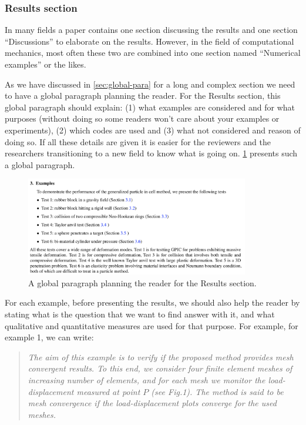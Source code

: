 \documentclass[authoryear,12pta4paper,fleqn]{article}
\numberwithin{equation}{section}
\theoremstyle{remark}
\begin{document}
\subsubsection{Results section}\label{sec:result}

In many fields a paper contains one section discussing the results and one section ``Discussions'' to elaborate on the results. However, in the field of computational mechanics, most often these two are combined into one section named ``Numerical examples'' or the likes.

As we have discussed in \cref{sec:global-para} for a long and complex section we need to have a global paragraph planning the reader. For the Results section, this global paragraph should explain: (1) what examples are considered and for what purposes (without doing so some readers won't care about your examples or experiments), (2) which codes are used and (3) what not considered and reason of doing so. If all these details are given it is easier for the reviewers and the researchers transitioning to a new field to know what is going on. \cref{fig:examples} presents such a global paragraph.

\begin{figure}[h!]
\centering
\includegraphics[width=0.87\textwidth]{examples}
\caption{A global paragraph planning the reader for the Results section.}
\label{fig:examples}
\end{figure}

For each example, before presenting the results, we should also help the reader by stating what is the question that we want to find answer with it, and what qualitative and quantitative measures are used for that purpose. For example, for example 1, we can write:

\begin{quote}
  \textit{
  The aim of this example is to verify if the proposed method provides mesh convergent results. To this end, we consider four finite element meshes of increasing number of elements, and for each mesh we monitor the load-displacement measured at point $P$ (see Fig.1). The method is said to be mesh convergence if the load-displacement plots converge for the used meshes.
  }
\end{quote}
\end{document}

